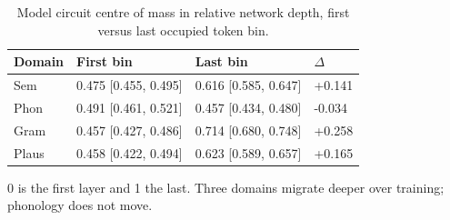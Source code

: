 \begin{table}[t]
\centering
\small
\begin{tabular}{llll}
\toprule
Domain & First bin & Last bin & $\Delta$ \\
\midrule
Sem & 0.475 [0.455, 0.495] & 0.616 [0.585, 0.647] & +0.141 \\
Phon & 0.491 [0.461, 0.521] & 0.457 [0.434, 0.480] & -0.034 \\
Gram & 0.457 [0.427, 0.486] & 0.714 [0.680, 0.748] & +0.258 \\
Plaus & 0.458 [0.422, 0.494] & 0.623 [0.589, 0.657] & +0.165 \\
\bottomrule
\end{tabular}
\vspace{2pt}
\begin{minipage}{\linewidth}\footnotesize 0 is the first layer and 1 the last. Three domains migrate deeper over training; phonology does not move.\end{minipage}
\caption{Model circuit centre of mass in relative network depth, first versus last occupied token bin.}
\label{tab:t6}
\end{table}
